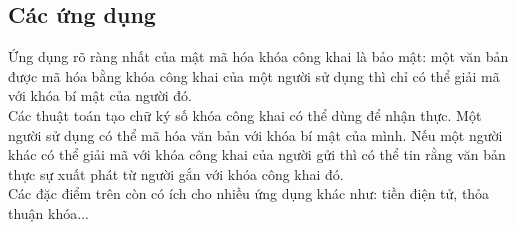 \subsection{Các ứng dụng}

Ứng dụng rõ ràng nhất của mật mã hóa khóa công khai là bảo mật: một văn bản được mã hóa bằng khóa công khai của một người sử dụng thì chỉ có thể giải mã với khóa bí mật của người đó.\\

Các thuật toán tạo chữ ký số khóa công khai có thể dùng để nhận thực. Một người sử dụng có thể mã hóa văn bản với khóa bí mật của mình. Nếu một người khác có thể giải mã với khóa công khai của người gửi thì có thể tin rằng văn bản thực sự xuất phát từ người gắn với khóa công khai đó.\\

Các đặc điểm trên còn có ích cho nhiều ứng dụng khác như: tiền điện tử, thỏa thuận khóa...

